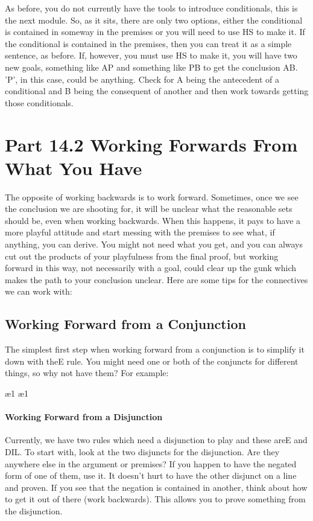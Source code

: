 As before, you do not currently have the tools to introduce conditionals, this is the next module. So, as it sits, there are only two options, either the conditional is contained in someway in the premises or you will need to use HS to make it. If the conditional is contained in the premises, then you can treat it as a simple sentence, as before. If, however, you must use HS to make it, you will have two new goals, something like A\eif P and something like P\eif B to get the conclusion A\eif B. 'P', in this case, could be anything. Check for A being the antecedent of a conditional and B being the consequent of another and then work towards getting those conditionals. 

\section{Part 14.2 Working Forwards From What You Have}
The opposite of working backwards is to work forward. Sometimes, once we see the conclusion we are shooting for, it will be unclear what the reasonable sets should be, even when working backwards. When this happens, it pays to have a more playful attitude and start messing with the premises to see what, if anything, you can derive. You might not need what you get, and you can always cut out the products of your playfulness from the final proof, but working forward in this way, not necessarily with a goal, could clear up the gunk which makes the path to your conclusion unclear. Here are some tips for the connectives we can work with:

\subsection{Working Forward from a Conjunction}

The simplest first step when working forward from a conjunction is to simplify it down with the\eand E rule. You might need one or both of the conjuncts for different things, so why not have them? For example:
\begin{fitchproof}
\ae{1}	
\ae{1}	
\end{fitchproof}

\paragraph{Working Forward from a Disjunction}

Currently, we have two rules which need a disjunction to play and these are\eor E and DIL. To start with, look at the two disjuncts for the disjunction. Are they anywhere else in the argument or premises? If you happen to have the negated form of one of them, use it. It doesn't hurt to have the other disjunct on a line and proven. If you see that the negation is contained in another, think about how to get it out of there (work backwards). This allows you to prove something from the disjunction. 

